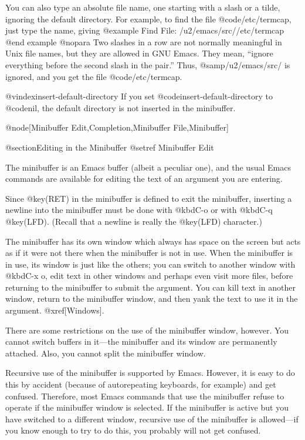 {{{{  You can also type an absolute file name, one starting with a slash or a
tilde, ignoring the default directory.  For example, to find the file
@code{/etc/termcap}, just type the name, giving
@example
Find File: /u2/emacs/src//etc/termcap
@end example
@nopara
Two slashes in a row are not normally meaningful in Unix file names, but
they are allowed in GNU Emacs.  They mean, ``ignore everything before the
second slash in the pair.''  Thus, @samp{/u2/emacs/src/} is ignored, and
you get the file @code{/etc/termcap}.

@vindex{insert-default-directory}
  If you set @code{insert-default-directory} to @code{nil}, the default
directory is not inserted in the minibuffer.

@node[Minibuffer Edit,Completion,Minibuffer File,Minibuffer]

@section{Editing in the Minibuffer}
@setref Minibuffer Edit

  The minibuffer is an Emacs buffer (albeit a peculiar one), and the usual
Emacs commands are available for editing the text of an argument you are
entering.

  Since @key(RET) in the minibuffer is defined to exit the
minibuffer, inserting a newline into the minibuffer must be done with
@kbd{C-o} or with @kbd{C-q @key(LFD)}.  (Recall that a newline is
really the @key(LFD) character.)

  The minibuffer has its own window which always has space on the
screen but acts as if it were not there when the minibuffer is not in use.
When the minibuffer is in use, its window is just like the others; you can
switch to another window with @kbd{C-x o}, edit text in other windows and
perhaps even visit more files, before returning to the minibuffer to submit
the argument.  You can kill text in another window, return to the
minibuffer window, and then yank the text to use it in the argument.
@xref[Windows].

  There are some restrictions on the use of the minibuffer window, however.
You cannot switch buffers in it---the minibuffer and its window are
permanently attached.  Also, you cannot split the minibuffer window.

  Recursive use of the minibuffer is supported by Emacs.  However, it is
easy to do this by accident (because of autorepeating keyboards, for
example) and get confused.  Therefore, most Emacs commands that use the
minibuffer refuse to operate if the minibuffer window is selected.
If the minibuffer is active but you have switched to a different window,
recursive use of the minibuffer is allowed---if you know enough to try to
do this, you probably will not get confused.

}}}}
